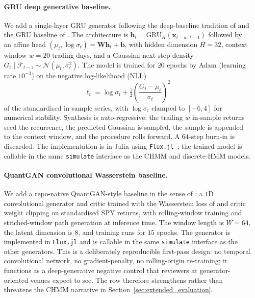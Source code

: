 \paragraph{GRU deep generative baseline.}
\label{sec:gru_methods}%
We add a single-layer GRU generator following the deep-baseline tradition of \citet{yoon2019timegan} and the GRU baseline of \citet{alswaidan2026hybrid}.
The architecture is $\mathbf{h}_t = \mathrm{GRU}_{H}(\mathbf{x}_{t-w:t-1})$ followed by an affine head $(\mu_t, \log \sigma_t) = \mathbf{W} \mathbf{h}_t + \mathbf{b}$, with hidden dimension $H = 32$, context window $w = 20$ trading days, and a Gaussian next-step density $G_t \mid \mathcal{F}_{t-1} \sim \mathcal{N}(\mu_t, \sigma_t^2)$.
The model is trained for $20$ epochs by Adam (learning rate $10^{-3}$) on the negative log-likelihood (NLL)
\begin{equation}
    \ell_t = \log \sigma_t + \tfrac{1}{2}\!\left(\frac{G_t - \mu_t}{\sigma_t}\right)^2
    \label{eq:gru_nll}
\end{equation}
of the standardised in-sample series, with $\log \sigma_t$ clamped to $[-6, 4]$ for numerical stability.
Synthesis is auto-regressive: the trailing $w$ in-sample returns seed the recurrence, the predicted Gaussian is sampled, the sample is appended to the context window, and the procedure rolls forward.
A $64$-step burn-in is discarded.
The implementation is in Julia using \texttt{Flux.jl}~\cite{innes2018flux}; the trained model is callable in the same \texttt{simulate} interface as the CHMM and discrete-HMM models.

\paragraph{QuantGAN convolutional Wasserstein baseline.}
\label{sec:quantgan_methods}%
We add a repo-native QuantGAN-style baseline in the sense of \citet{wiese2020quantgan}: a $1$D convolutional generator and critic trained with the Wasserstein loss of \citet{arjovsky2017wasserstein} and critic weight clipping on standardised SPY returns, with rolling-window training and stitched-window path generation at inference time.
The window length is $W = 64$, the latent dimension is $8$, and training runs for $15$ epochs.
The generator is implemented in \texttt{Flux.jl} and is callable in the same \texttt{simulate} interface as the other generators.
This is a deliberately reproducible first-pass design: no temporal convolutional network, no gradient-penalty, no rolling-origin re-training; it functions as a deep-generative negative control that reviewers at generator-oriented venues expect to see.
The row therefore strengthens rather than threatens the CHMM narrative in Section~\ref{sec:extended_evaluation}.

